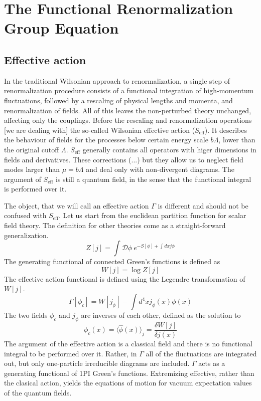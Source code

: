 \documentclass[11pt, a4paper]{article}
\begin{document}
\section{The Functional Renormalization Group Equation}

\subsection*{\centering Effective action}

In the traditional Wilsonian approach to renormalization, a single step of renormalization procedure consists of
a functional integration of high-momentum fluctuations, followed by a rescaling of physical lengths and momenta, and
renormalization of fields. All of this leaves the non-perturbed theory unchanged, affecting only the couplings.
Before the rescaling and renormalization operations [we are dealing with] the so-called Wilsonian effective action ($S_{\text{eff}}$).
It describes the behaviour of fields for the processes below certain energy scale $b\Lambda$, lower than the original cutoff $\Lambda$.
$S_{\text{eff}}$ generally contains all operators with higer dimensions in fields and derivatives.
These corrections (...) but they allow us to neglect field modes larger than $\mu = b\Lambda$ and deal only with non-divergent diagrams.
The argument of $S_{\text{eff}}$ is still a quantum field, in the sense that the functional integral is performed over it. %

The object, that we will call an effective action $\Gamma$ is different and should not be confused with $S_{\text{eff}}$.
Let us start from the euclidean partition function for scalar field theory. The definition for other theories
come as a straight-forward generalization.
\begin{equation}
    Z[j] = \int \mathcal{D}\phi \ e^{-S[\phi] + \int dx j \phi}
\end{equation}
The generating functional of connected Green's functions is defined as
\begin{equation}
    W[j] = \log{Z[j]}
\end{equation}
The effective action functional is defined using the Legendre transformation of $W[j]$.
\begin{equation}
    \Gamma[\phi_c] = W[j_\phi] - \int d^4 x j_\phi(x) \phi(x)
\end{equation}
The two fields $\phi_c$ and $j_\phi$ are inverses of each other, defined as the solution to
\begin{equation}
    \phi_c(x) = \langle \hat\phi (x) \rangle_j = \frac{\delta W[j]}{\delta j(x)}
\end{equation}
The argument of the effective action is a classical field and there is no functional integral to be performed over it.
Rather, in $\Gamma$ all of the fluctuations are integrated out, but only one-particle irreducible diagrams
are included. $\Gamma$ acts as a generating functional of 1PI Green's functions. Extremizing effective, rather than
the clasical action, yields the equations of motion for vacuum expectation values of the quantum fields.
\end{document}
